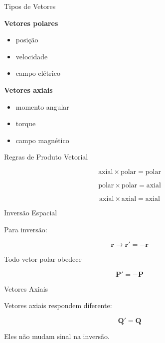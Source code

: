 \documentclass[aspectratio=169]{beamer}
\begin{document}
\begin{frame}{Tipos de Vetores}

\textbf{Vetores polares}

\begin{itemize}
\item posição
\item velocidade
\item campo elétrico
\end{itemize}

\textbf{Vetores axiais}

\begin{itemize}
\item momento angular
\item torque
\item campo magnético
\end{itemize}

\end{frame}

\begin{frame}{Regras de Produto Vetorial}

\[
\text{axial} \times \text{polar} = \text{polar}
\]

\[
\text{polar} \times \text{polar} = \text{axial}
\]

\[
\text{axial} \times \text{axial} = \text{axial}
\]

\end{frame}

\begin{frame}{Inversão Espacial}

Para inversão:

\[
\mathbf r \rightarrow \mathbf r' = -\mathbf r
\]

Todo vetor polar obedece

\[
\mathbf P' = -\mathbf P
\]

\end{frame}

\begin{frame}{Vetores Axiais}

Vetores axiais respondem diferente:

\[
\mathbf Q' = \mathbf Q
\]

Eles não mudam sinal na inversão.

\end{frame}
\end{document}
